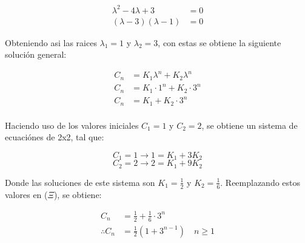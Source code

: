 \begin{align*}
\lambda^{2} -4\lambda + 3 &= 0 \\
(\lambda -3)(\lambda-1) &= 0
\end{align*}

Obteniendo asi las raices $\lambda_1=1$ y $\lambda_2=3$, con estas se obtiene la siguiente solución general:

\begin{align*}
    C_n &= K_1 \lambda^n + K_2 \lambda^n \\
    C_n &= K_1 \cdot 1^n + K_2 \cdot 3^n \\
    C_n &= K_1+ K_2 \cdot 3^n \tag{$\Xi$} \\
\end{align*}

Haciendo uso de los valores iniciales $C_1=1$ y $C_2=2$, se obtiene un sistema de ecuaciónes de 2x2, tal que:

$$C_1=1 \rightarrow 1 = K_1 + 3K_2$$
$$C_2=2 \rightarrow 2 = K_1 + 9K_2$$

Donde las soluciones de este sistema son $K_1=\frac{1}{2}$ y $K_2=\frac{1}{6}$. Reemplazando estos valores en ($\Xi$), se obtiene:

\begin{align*}
    C_n &= \frac{1}{2} + \frac{1}{6} \cdot 3^n \\
    \therefore C_n &= \frac{1}{2} (1 + 3^{n-1}) \quad n \ge 1
\end{align*}
